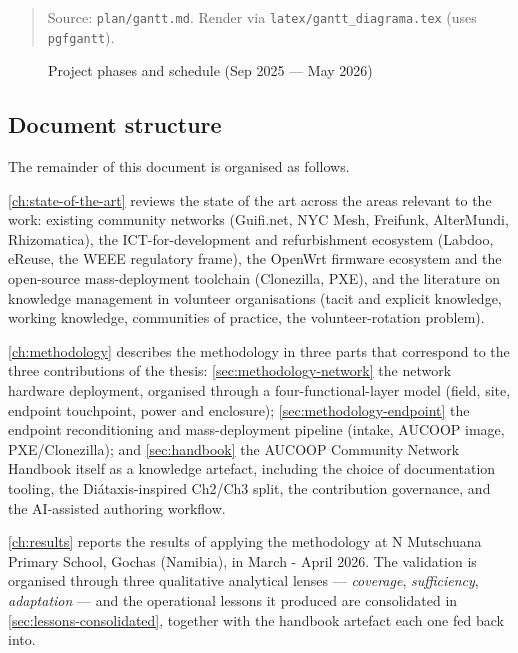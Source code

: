 \begin{quote}
Source: \texttt{plan/gantt.md}. Render via
\texttt{latex/gantt\_diagrama.tex} (uses \texttt{pgfgantt}).
\end{quote}

\begin{figure}[ht]
  \centering
  
  \caption{Project phases and schedule (Sep 2025 — May 2026)}
\end{figure}

\hypertarget{document-structure}{%
\subsection{Document structure}\label{document-structure}}

The remainder of this document is organised as follows.

\autoref{ch:state-of-the-art} reviews the state of the art across the
areas relevant to the work: existing community networks (Guifi.net, NYC
Mesh, Freifunk, AlterMundi, Rhizomatica), the ICT-for-development and
refurbishment ecosystem (Labdoo, eReuse, the WEEE regulatory frame), the
OpenWrt firmware ecosystem and the open-source mass-deployment toolchain
(Clonezilla, PXE), and the literature on knowledge management in
volunteer organisations (tacit and explicit knowledge, working
knowledge, communities of practice, the volunteer-rotation problem).

\autoref{ch:methodology} describes the methodology in three parts that
correspond to the three contributions of the thesis:
\autoref{sec:methodology-network} the network hardware deployment,
organised through a four-functional-layer model (field, site, endpoint
touchpoint, power and enclosure); \autoref{sec:methodology-endpoint} the
endpoint reconditioning and mass-deployment pipeline (intake, AUCOOP
image, PXE/Clonezilla); and \autoref{sec:handbook} the AUCOOP Community
Network Handbook itself as a knowledge artefact, including the choice of
documentation tooling, the Diátaxis-inspired Ch2/Ch3 split, the
contribution governance, and the AI-assisted authoring workflow.

\autoref{ch:results} reports the results of applying the methodology at
N Mutschuana Primary School, Gochas (Namibia), in March - April 2026.
The validation is organised through three qualitative analytical lenses
--- \emph{coverage}, \emph{sufficiency}, \emph{adaptation} --- and the
operational lessons it produced are consolidated in
\autoref{sec:lessons-consolidated}, together with the handbook artefact
each one fed back into.

